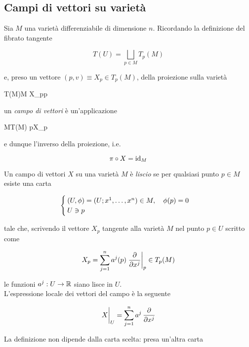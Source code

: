 \subsection{Campi di vettori su varietà}

Sia $ M $ una varietà differenziabile di dimensione $ n $. Ricordando la definizione del fibrato tangente

\begin{equation}
	T(U) = \bigsqcup_{p \in M} T_{p}(M)
\end{equation}

e, preso un vettore $ (p,v) \equiv X_{p} \in T_{p}(M) $, della proiezione sulla varietà

\map{\pi}
	{T(M)}{M}
	{X_{p}}{p}

un \textit{campo di vettori} è un'applicazione

	{M}{T(M)}
	{p}{X_{p}}

e dunque l'inverso della proiezione, i.e.

\begin{equation}
	\pi \circ X = \operatorname{id}_{M}
\end{equation}

Un campo di vettori $ X $ su una varietà $ M $ è \textit{liscio} se per qualsiasi punto $ p \in M $ esiste una carta

\begin{equation}
	\begin{cases}
		(U,\phi) = (U; x^{1},\dots,x^{n}) \in M \qcomma \phi(p) = 0 \\
		U \ni p
	\end{cases}
\end{equation}

tale che, scrivendo il vettore $ X_{p} $ tangente alla varietà $ M $ nel punto $ p \in U $ scritto come

\begin{equation}
	X_{p} = \sum_{j=1}^{n} a^{j}(p) \eval{ \pdv{x^{j}} }_{p} \in T_{p}(M)
\end{equation}

le funzioni $ a^{j} : U \to \mathbb{R} $ siano lisce in $ U $.\\
L'espressione locale dei vettori del campo è la seguente

\begin{equation}
	\eval{X}_{U} = \sum_{j=1}^{n} a^{j} \, \pdv{x^{j}}
\end{equation}

La definizione non dipende dalla carta scelta: presa un'altra carta

